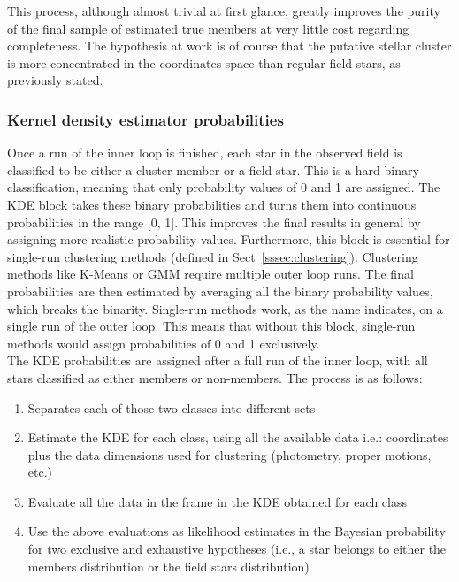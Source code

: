 \documentclass{aa}
\begin{document}
 This process, although almost trivial at first glance, greatly improves the
 purity of the final sample of estimated true members at very little cost
 regarding completeness. The hypothesis at work is of course that the putative
 stellar cluster is more concentrated in the coordinates space than regular
 field stars, as previously stated.



\subsubsection{Kernel density estimator probabilities}
 \label{sssec:kde-probs}

 Once a run of the inner loop is finished, each star in the observed field is
 classified to be either a cluster member or a field star. This is a hard
 binary classification, meaning that only probability values of 0 and 1 are
 assigned. The KDE block takes these binary probabilities and turns them into
 continuous probabilities in the range [0, 1]. This improves the final results
 in general by assigning more realistic probability values. Furthermore, this
 block is essential for single-run clustering methods (defined in
 Sect~\ref{sssec:clustering}). Clustering methods like K-Means or GMM
 require multiple outer loop runs. The final probabilities are then estimated
 by averaging all the binary probability values, which breaks the binarity.
 Single-run methods work, as the name indicates, on a single run of the outer
 loop. This means that without this block, single-run methods would assign
 probabilities of 0 and 1 exclusively.\\

 The KDE probabilities are assigned after a full run of the inner loop, with
 all stars classified as either members or non-members. The process is as
 follows:

 \begin{enumerate}
  \item Separates each of those two classes into different sets
  \item Estimate the KDE for each class, using all the available data i.e.:
  coordinates plus the data dimensions used for clustering (photometry, proper
  motions, etc.)
  \item Evaluate all the data in the frame in the KDE obtained for each class
  \item Use the above evaluations as likelihood estimates in the Bayesian
  probability for two exclusive and exhaustive hypotheses (i.e., a star
  belongs to either the members distribution or the field stars distribution)
 \end{enumerate}
\end{document}
